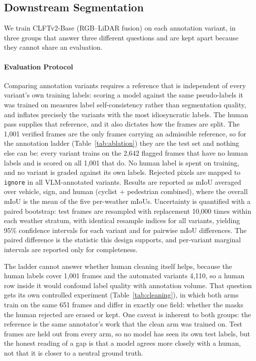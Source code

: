 \documentclass[conference]{IEEEtran}
\begin{document}
\subsection{Downstream Segmentation}

We train CLFTv2-Base (RGB--LiDAR fusion) on each annotation variant, in three groups that answer three
different questions and are kept apart because they cannot share an evaluation.

\paragraph{Evaluation Protocol}
Comparing annotation variants requires a reference that is independent of every variant's own training labels: scoring a model against the same pseudo-labels it was trained on measures label self-consistency rather than segmentation quality, and inflates precisely the variants with the most idiosyncratic labels.
The human pass supplies that reference, and it also dictates how the frames are split.
The 1{,}001 verified frames are the only frames carrying an admissible reference, so for the annotation
ladder (Table~\ref{tab:ablation}) they are the test set and nothing else can be: every variant trains on
the 2{,}642 flagged frames that have no human labels and is scored on all 1{,}001 that do. No human
label is spent on training, and no variant is graded against its own labels.
Rejected pixels are mapped to \texttt{ignore} in all VLM-annotated variants.
Results are reported as mIoU averaged over vehicle, sign, and human (cyclist + pedestrian combined), where the overall mIoU is the mean of the five per-weather mIoUs.
Uncertainty is quantified with a paired bootstrap: test frames are resampled with replacement 10{,}000 times within each weather stratum, with identical resample indices for all variants, yielding 95\% confidence intervals for each variant and for pairwise mIoU differences.
The paired difference is the statistic this design supports, and per-variant marginal intervals are
reported only for completeness.

The ladder cannot answer whether human cleaning itself helps, because the human labels cover 1{,}001
frames and the automated variants 4{,}110, so a human row inside it would confound label quality with
annotation volume. That question gets its own controlled experiment (Table~\ref{tab:cleaning}), in which
both arms train on the same 651 frames and differ in exactly one field: whether the masks the human
rejected are erased or kept.
One caveat is inherent to both groups: the reference is the same annotator's work that the
clean arm was trained on. Test frames are held out from every arm, so no model has seen its own test
labels, but the honest reading of a gap is that a model agrees more closely with a human, not that it
is closer to a neutral ground truth.
\end{document}
